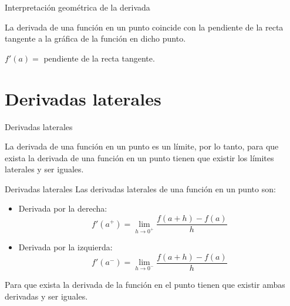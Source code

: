 \documentclass[8pt]{beamer}
\begin{document}
\begin{frame}{Interpretación geométrica de la derivada}
\pause

La derivada de una función en un punto coincide con la pendiente de la recta tangente a la gráfica de la función en dicho punto. 

$f'(a)=$ pendiente de la recta tangente.
\end{frame}
\section{Derivadas laterales}
\begin{frame}{Derivadas laterales}

La derivada de una función en un punto es un límite, por lo tanto, para que exista la derivada de una función en un punto tienen que existir los límites laterales y ser iguales.

\pause
\begin{alertblock}{Derivadas laterales}
Las derivadas laterales de una función en un punto son:

\begin{itemize}
\item Derivada por la derecha:
\[ f'(a^+)=\lim_{h \rightarrow 0^+} \dfrac{f(a+h)-f(a)}{h} \]
\pause
\item Derivada por la izquierda:
\[ f'(a^-)=\lim_{h \rightarrow 0^-} \dfrac{f(a+h)-f(a)}{h} \]
\end{itemize}


\end{alertblock}
\pause
Para que exista la derivada de la función en el punto tienen que existir ambas derivadas y ser iguales.
\end{frame}
\end{document}
